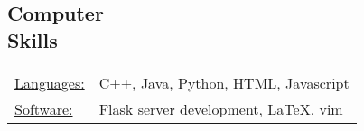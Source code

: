 \documentclass[margin]{res}
\begin{document}
\begin{resume}
\section{Computer \\ Skills}
   \begin{tabular}{l p{3in}}
    \underline{Languages:} & C++, Java, Python, HTML, Javascript \\

     \underline{Software:} & Flask server development, \LaTeX, vim
 \end{tabular}

\end{resume} 
\end{document}
